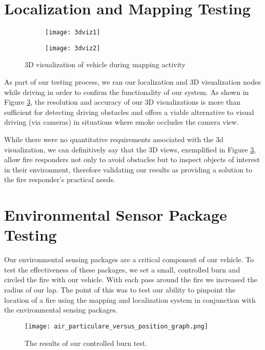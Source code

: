\section{Localization and Mapping Testing}

\begin{figure}[H]
	\centering
	\begin{subfigure}{.5\textwidth}
		\centering
		\texttt{[image: 3dviz1]}
		\label{fig:3dviz1}
	\end{subfigure}%
	\begin{subfigure}{.5\textwidth}
		\centering
		\texttt{[image: 3dviz2]}
		\label{fig:3dviz2}
	\end{subfigure}
	\caption{3D visualization of vehicle during mapping activity}
	\label{fig:3dviz}
\end{figure}

As part of our testing process, we ran our localization and 3D visualization nodes while driving in order to confirm the functionality of our system. As shown in Figure \ref{fig:3dviz}, the resolution and accuracy of our 3D visualizations is more than sufficient for detecting driving obstacles and offers a viable alternative to visual driving (via cameras) in situations where smoke occludes the camera view.

While there were no quantitative requirements associated with the 3d visualization, we can definitively say that the 3D views, exemplified in Figure \ref{fig:3dviz}, allow fire responders not only to avoid obstacles but to inspect objects of interest in their environment, therefore validating our results as providing a solution to the fire responder's practical needs.

\section{Environmental Sensor Package Testing}
Our environmental sensing packages are a critical component of our vehicle.  To test the effectiveness of these packages, we set a small, controlled burn and circled the fire with our vehicle.  With each pass around the fire we increased the radius of our lap.  The point of this was to test our ability to pinpoint the location of a fire using the mapping and localization system in conjunction with the environmental sensing packages.

\begin{figure}[H]
\centerline{\texttt{[image: air\_particulare\_versus\_position\_graph.png]}}
\caption[]{The results of our controlled burn test.}
\label{fig:air_particulate_versus_position_graph}
\end{figure}

